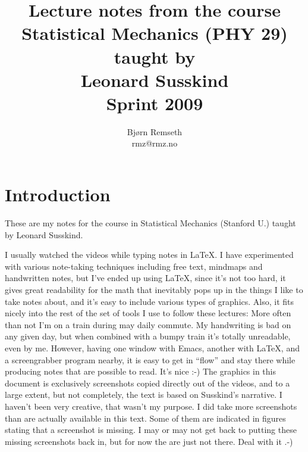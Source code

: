 \documentclass[a4, 12pt, english, USenglish]{scrreprt}
\begin{document}
\title{Lecture notes from the course \\
Statistical Mechanics (PHY 29)\\
taught by \\
Leonard Susskind \\
Sprint 2009}

\author{Bj\o{}rn Remseth \\ rmz@rmz.no}

\maketitle
\tableofcontents



\begin{abstract}

\end{abstract}

\chapter*{Introduction}

These are my notes for the course in Statistical Mechanics (Stanford U.) taught by
Leonard Susskind.    

I usually watched the videos while typing notes in \LaTeX.  I have
experimented with various note-taking techniques including free text,
mindmaps and handwritten notes, but I've ended up using \LaTeX, since
it's not too hard, it gives great readability for the math that
inevitably pops up in the things I like to take notes about, and it's
easy to include various types of graphics.  Also, it fits nicely into
the rest of the set of tools I use to follow these lectures: More
often than not I'm on a train during may daily commute.  My
handwriting is bad on any given day, but when combined with a bumpy
train it's totally unreadable, even by me.  However, having one window
with Emacs, another with \LaTeX, and a screengrabber program nearby,
it is easy to get in ``flow'' and stay there while producing notes
that are possible to read.  It's nice :-) The graphics in this
document is exclusively screenshots copied directly out of the videos,
and to a large extent, but not completely, the text is based on
Susskind's narrative.  I haven't been very creative, that wasn't my
purpose.  I did take more screenshots than are actually available in
this text.  Some of them are indicated in figures stating that a
screenshot is missing.  I may or may not get back to putting these
missing screenshots back in, but for now the are just not there.  Deal
with it .-)
\end{document}
